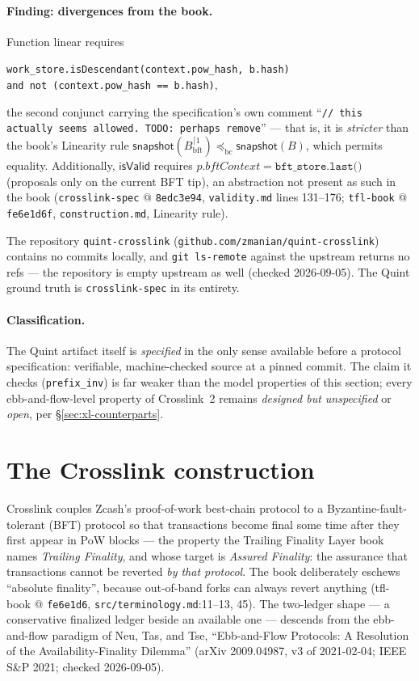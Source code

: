 \documentclass[11pt,a4paper]{article}
\theoremstyle{definition}
\begin{document}
\paragraph{Finding: divergences from the book.} Function \textsf{linear}
requires
\begin{center}
\texttt{work\_store.isDescendant(context.pow\_hash, b.hash)}\\
\texttt{and not (context.pow\_hash == b.hash)},
\end{center}
the second conjunct carrying the specification's own comment
``\texttt{//~this actually seems allowed. TODO: perhaps remove}'' ---
that is, it is \emph{stricter} than the book's Linearity
rule $\mathsf{snapshot}(B^{\lceil 1}_{\mathrm{bft}})
\preceq_{\mathrm{bc}} \mathsf{snapshot}(B)$, which permits equality.
Additionally, $\mathsf{isValid}$ requires
$p.\mathit{bftContext} = \texttt{bft\_store.last()}$ (proposals only on
the current BFT tip), an abstraction not present as such in the book
(\texttt{crosslink-spec} @ \texttt{8edc3e94}, \texttt{validity.md} lines
131--176; \texttt{tfl-book} @ \texttt{fe6e1d6f},
\texttt{construction.md}, Linearity rule).

The repository \texttt{quint-crosslink}
(\texttt{github.com/zmanian/quint-crosslink}) contains no commits locally,
and \texttt{git ls-remote} against the upstream returns no refs --- the
repository is empty upstream as well (checked 2026-09-05). The Quint
ground truth is \texttt{crosslink-spec} in its entirety.

\paragraph{Classification.} The Quint artifact itself is
\emph{specified} in the only sense available before a protocol
specification: verifiable, machine-checked source at a pinned commit. The
claim it checks (\texttt{prefix\_inv}) is far weaker than the model
properties of this section; every ebb-and-flow-level property of
Crosslink~2 remains \emph{designed but unspecified} or \emph{open}, per
\S\ref{sec:xl-counterparts}.

\section{The Crosslink construction}\label{sec:xl-construction}

Crosslink couples Zcash's proof-of-work best-chain protocol to a
Byzantine-fault-tolerant (BFT) protocol so that transactions become final
some time after they first appear in PoW blocks --- the property the
Trailing Finality Layer book names \emph{Trailing Finality}, and whose
target is \emph{Assured Finality}: the assurance that transactions cannot
be reverted \emph{by that protocol}. The book deliberately eschews
``absolute finality'', because out-of-band forks can always revert
anything (tfl-book @ \texttt{fe6e1d6}, \texttt{src/terminology.md}:11--13,
45). The two-ledger shape --- a conservative finalized ledger beside an
available one --- descends from the ebb-and-flow paradigm of Neu, Tas, and
Tse, ``Ebb-and-Flow Protocols: A Resolution of the Availability-Finality
Dilemma'' (arXiv 2009.04987, v3 of 2021-02-04; IEEE S\&P 2021; checked
2026-09-05).
\end{document}
